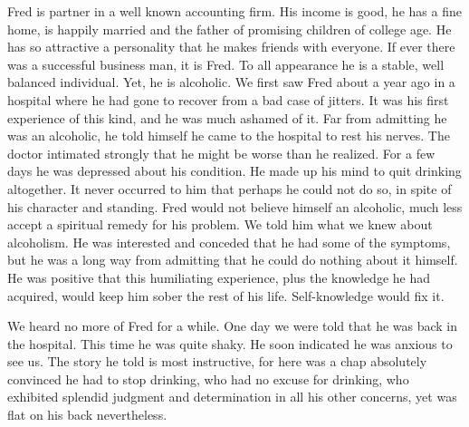 \begin{biblechapter}
    Fred is partner in a well known accounting firm. 
\verse His income is good, he has a fine home, 
    is happily married and the father of promising children of college age. 
\verse He has so attractive a personality 
    that he makes friends with everyone. 
\verse If ever there was a successful business man, it is Fred. 
\verse To all appearance he is a stable, well balanced individual. 
\verse Yet, he is alcoholic. 
\verse We first saw Fred about a year ago in a hospital 
    where he had gone to recover from a bad case of jitters. 
\verse It was his first experience of this kind, 
    and he was much ashamed of it. 
\verse Far from admitting he was an alcoholic, 
    he told himself he came to the hospital to rest his nerves. 
\verse The doctor intimated strongly 
    that he might be worse than he realized. 
\verse For a few days he was depressed about his condition. 
\verse He made up his mind to quit drinking altogether. 
\verse It never occurred to him that perhaps he could not do so, 
    in spite of his character and standing. 
\verse Fred would not believe himself an alcoholic, 
    much less accept a spiritual remedy for his problem. 
\verse We told him what we knew about alcoholism. 
\verse He was interested and conceded that he had some of the symptoms, 
    but he was a long way from admitting 
    that he could do nothing about it himself. 
\verse He was positive that this humiliating experience, 
    plus the knowledge he had acquired, 
    would keep him sober the rest of his life. 
\verse Self-knowledge would fix it.

\verse We heard no more of Fred for a while. 
\verse One day we were told that he was back in the hospital. 
\verse This time he was quite shaky. 
\verse He soon indicated he was anxious to see us. 
\verse The story he told is most instructive, 
    for here was a chap absolutely convinced he had to stop drinking, 
    who had no excuse for drinking, 
    who exhibited splendid judgment 
    and determination in all his other concerns, 
    yet was flat on his back nevertheless.
\end{biblechapter}


